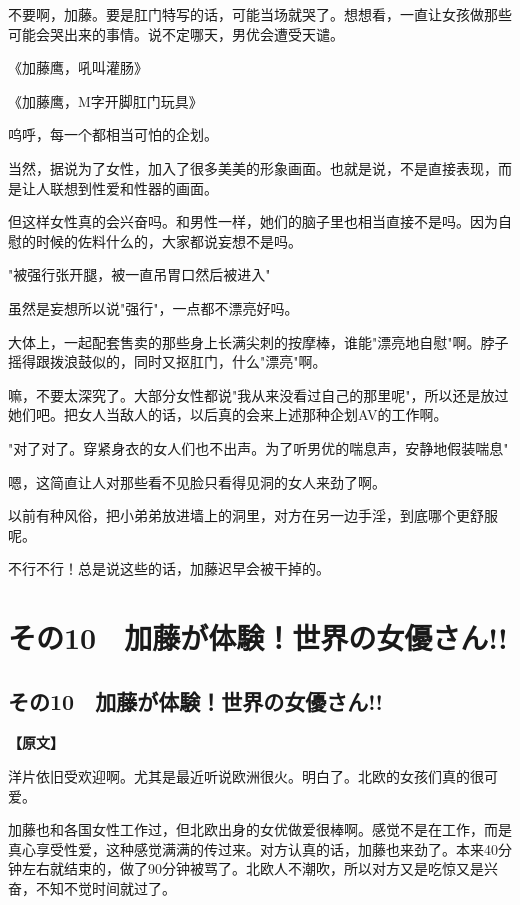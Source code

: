 \documentclass[12pt,UTF8]{ctexbook}
\begin{document}
{不要啊，加藤。要是肛门特写的话，可能当场就哭了。想想看，一直让女孩做那些可能会哭出来的事情。说不定哪天，男优会遭受天谴。

《加藤鹰，吼叫灌肠》

《加藤鹰，M字开脚肛门玩具》

呜呼，每一个都相当可怕的企划。

当然，据说为了女性，加入了很多美美的形象画面。也就是说，不是直接表现，而是让人联想到性爱和性器的画面。

但这样女性真的会兴奋吗。和男性一样，她们的脑子里也相当直接不是吗。因为自慰的时候的佐料什么的，大家都说妄想不是吗。

"被强行张开腿，被一直吊胃口然后被进入"

虽然是妄想所以说"强行"，一点都不漂亮好吗。

大体上，一起配套售卖的那些身上长满尖刺的按摩棒，谁能"漂亮地自慰"啊。脖子摇得跟拨浪鼓似的，同时又抠肛门，什么"漂亮"啊。

嘛，不要太深究了。大部分女性都说"我从来没看过自己的那里呢"，所以还是放过她们吧。把女人当敌人的话，以后真的会来上述那种企划AV的工作啊。

"对了对了。穿紧身衣的女人们也不出声。为了听男优的喘息声，安静地假装喘息"

嗯，这简直让人对那些看不见脸只看得见洞的女人来劲了啊。

以前有种风俗，把小弟弟放进墙上的洞里，对方在另一边手淫，到底哪个更舒服呢。

不行不行！总是说这些的话，加藤迟早会被干掉的。

\chapter{その10　加藤が体験！世界の女優さん!!}
\label{chap:10}

\section{その10　加藤が体験！世界の女優さん!!}

\vspace{1ex}
\parbox{0.9\linewidth}{
\textbf{【原文】}\par

洋片依旧受欢迎啊。尤其是最近听说欧洲很火。明白了。北欧的女孩们真的很可爱。

加藤也和各国女性工作过，但北欧出身的女优做爱很棒啊。感觉不是在工作，而是真心享受性爱，这种感觉满满的传过来。对方认真的话，加藤也来劲了。本来40分钟左右就结束的，做了90分钟被骂了。北欧人不潮吹，所以对方又是吃惊又是兴奋，不知不觉时间就过了。

}}
\end{document}
